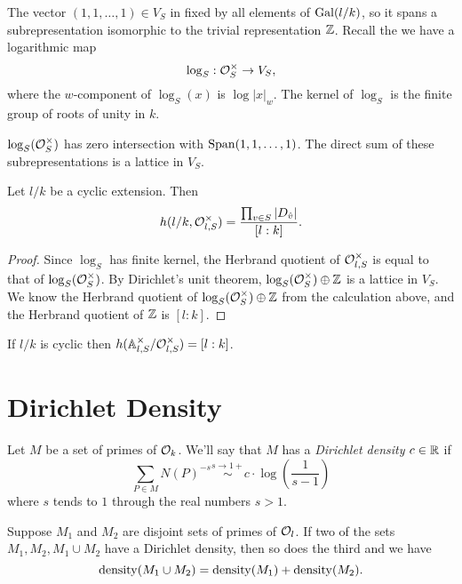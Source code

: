 The vector $(1,1,\ldots,1) \in V_S$ in fixed by all elements of $\mathrm{Gal}(l/k)$, so it spans
a subrepresentation isomorphic to the trivial representation ${\mathbb Z}$.
Recall the we have a logarithmic map
\[
	\log_S : {\mathcal O}_S^\times \to V_S,
\]
where the $w$-component of $\log_S(x)$ is $\log |x|_w$.
The kernel of $\log_S$ is the finite group of roots of unity in $k$.

\begin{theorem} \label{thm:Dirichlet unit theorem}
	$\log_S({\mathcal O}_S^\times)$ has zero intersection with $\mathrm{Span} (1,1,\ldots,1)$.
	The direct sum of these subrepresentations is a lattice in $V_S$.
\end{theorem}

\begin{corollary}
	Let $l/k$ be a cyclic extension. Then
	\[
		h(l/k,{\mathcal O}_{l,S}^\times) = \frac{\prod_{v\in S} |D_{\hat v}|}{[l:k]}.
	\]
\end{corollary}

\begin{proof}
	Since $\log_S$ has finite kernel, the Herbrand quotient of ${\mathcal O}_{l,S}^\times$ is
	equal to that of $\log_S({\mathcal O}_S^\times)$.
	By Dirichlet's unit theorem, $\log_S({\mathcal O}_S^\times) \oplus {\mathbb Z}$ is a lattice in
	$V_S$.
	We know the Herbrand quotient of $\log_S({\mathcal O}_S^\times) \oplus {\mathbb Z}$ from the calculation above,
	and the Herbrand quotient of ${\mathbb Z}$ is $[l:k]$.
\end{proof}

\begin{corollary}
	If $l/k$ is cyclic then $h({\mathbb A}_{l,S}^\times / {\mathcal O}_{l,S}^\times) = [l:k]$.
\end{corollary}




\section{Dirichlet Density}

\begin{definition} \label{def:Dirichlet density}
	Let $M$ be a set of primes of ${\mathcal O}_k$.
	We'll say that $M$ has a \emph{Dirichlet density} $c \in {\mathbb R}$ if
	\[
		\sum_{P \in M} N(P)^{-s} \stackrel{s \to 1+}\sim c  \cdot \log\left(\frac{1}{s-1}\right)
	\]
	where $s$ tends to $1$ through the real numbers $s>1$.
\end{definition}


\begin{lemma}
	Suppose $M_1$ and $M_2$ are disjoint sets of primes of ${\mathcal O}_l$.
	If two of the sets $M_1, M_2, M_1 \cup M_2$ have a Dirichlet density, then so does the third
	and we have
	\[
		\mathrm{density}(M_1 \cup M_2) = \mathrm{density}(M_1) + \mathrm{density}(M_2).
	\]
\end{lemma}

